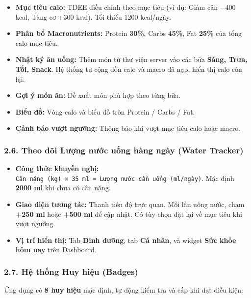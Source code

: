 \documentclass[12pt,a4paper]{article}
\providecommand{\tightlist}{%
  \setlength{\itemsep}{0pt}\setlength{\parskip}{0pt}}
\begin{document}
\begin{itemize}
\tightlist
\item
  \textbf{Mục tiêu calo:} TDEE điều chỉnh theo mục tiêu (ví dụ: Giảm cân
  −400 kcal, Tăng cơ +300 kcal). Tối thiểu 1200 kcal/ngày.
\item
  \textbf{Phân bổ Macronutrients:} Protein \textbf{30\%}, Carbs
  \textbf{45\%}, Fat \textbf{25\%} của tổng calo mục tiêu.
\item
  \textbf{Nhật ký ăn uống:} Thêm món từ thư viện server vào các bữa
  \textbf{Sáng, Trưa, Tối, Snack}. Hệ thống tự cộng dồn calo và macro đã
  nạp, hiển thị calo còn lại.
\item
  \textbf{Gợi ý món ăn:} Đề xuất món phù hợp theo từng bữa.
\item
  \textbf{Biểu đồ:} Vòng calo và biểu đồ tròn Protein / Carbs / Fat.
\item
  \textbf{Cảnh báo vượt ngưỡng:} Thông báo khi vượt mục tiêu calo hoặc
  macro.
\end{itemize}

\subsubsection{2.6. Theo dõi Lượng nước uống hàng ngày (Water
Tracker)}\label{theo-duxf5i-lux1b0ux1ee3ng-nux1b0ux1edbc-uux1ed1ng-huxe0ng-nguxe0y-water-tracker}

\begin{itemize}
\tightlist
\item
  \textbf{Công thức khuyến nghị:}
  \texttt{Cân\ nặng\ (kg)\ ×\ 35\ ml\ =\ Lượng\ nước\ cần\ uống\ (ml/ngày)}.
  Mặc định \textbf{2000 ml} khi chưa có cân nặng.
\item
  \textbf{Giao diện tương tác:} Thanh tiến độ trực quan. Mỗi lần uống
  nước, chạm \textbf{+250 ml} hoặc \textbf{+500 ml} để cập nhật. Có tùy
  chọn đặt lại về mục tiêu khi vượt ngưỡng.
\item
  \textbf{Vị trí hiển thị:} Tab \textbf{Dinh dưỡng}, tab \textbf{Cá
  nhân}, và widget \textbf{Sức khỏe hôm nay} trên Dashboard.
\end{itemize}

\subsubsection{2.7. Hệ thống Huy hiệu
(Badges)}\label{hux1ec7-thux1ed1ng-huy-hiux1ec7u-badges}

Ứng dụng có \textbf{8 huy hiệu} mặc định, tự động kiểm tra và cấp khi
đạt điều kiện:
\end{document}
